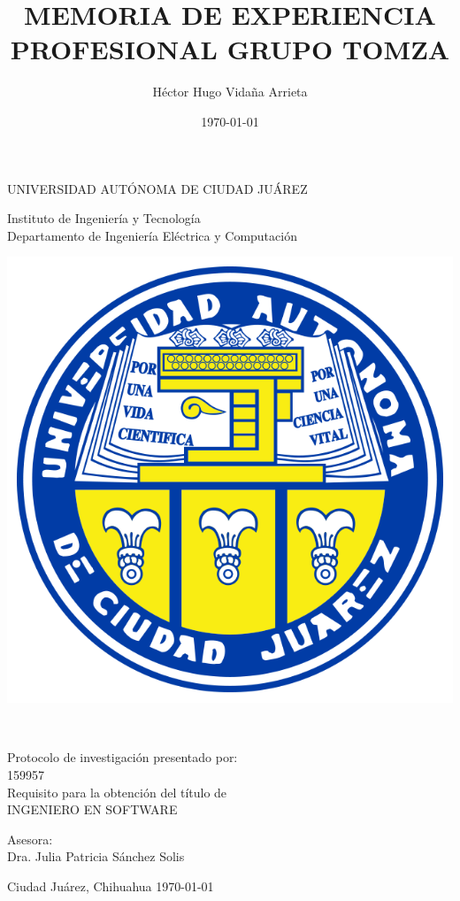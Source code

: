 \documentclass[final, fmstyle, 12pt]{article}
\title{MEMORIA DE EXPERIENCIA PROFESIONAL GRUPO TOMZA}
\author{Héctor Hugo Vidaña Arrieta}
\date{\today}
\begin{document}
\renewcommand{\tablename}{Tabla}
	\thispagestyle{empty}
\begin{center} \vfill
{\Large UNIVERSIDAD AUTÓNOMA DE CIUDAD JUÁREZ}\\
\vspace{6mm}
{\large Instituto de Ingeniería y Tecnología\\
\vspace{6mm}
Departamento de Ingeniería Eléctrica y Computación
\vspace{20mm}

\includegraphics [scale=0.7]{Imagenes/escudo-uacj} 
\vspace{10mm}


\thetitle\\
\vspace{15mm}

Protocolo de investigación presentado por:\\
\vspace{6mm}
\theauthor\hspace{10mm} 159957\\
\vspace{10mm}
Requisito para la obtención del título de\\
\vspace{6mm}
INGENIERO EN SOFTWARE\\
\vspace{10mm}

Asesora:\\
{Dra. Julia Patricia Sánchez Solis}\\
} \vfill
	Ciudad Juárez, Chihuahua \hspace{70mm}\today

\clearpage

\end{center}
\end{document}
